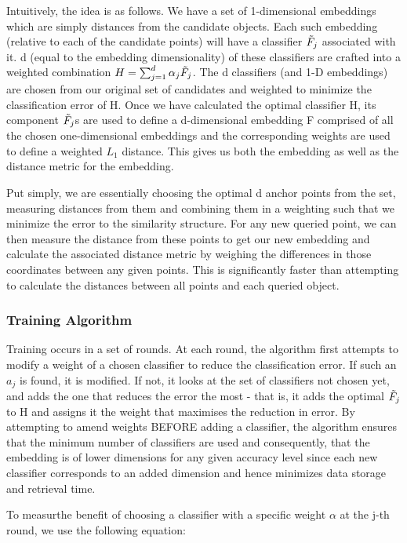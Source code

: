 Intuitively, the idea is as follows. We have a set of 1-dimensional embeddings which are simply distances from the candidate objects. Each such embedding (relative to each of the candidate points) will have a classifier $\Tilde{F}_j$ associated with it. d (equal to the embedding dimensionality) of these classifiers are crafted into a weighted combination $H = \sum_{j=1}^d \alpha_j \Tilde{F}_j$. The d classifiers (and 1-D embeddings) are chosen from our original set of candidates and weighted to minimize the classification error of H. 
Once we have calculated the optimal classifier H, its component $\Tilde{F}_j$s are used to define a d-dimensional embedding F comprised of all the chosen one-dimensional embeddings and the corresponding weights are used to define a weighted $L_1$ distance. This gives us both the embedding as well as the distance metric for the embedding.

Put simply, we are essentially choosing the optimal d anchor points from the set, measuring distances from them and combining them in a weighting such that we minimize the error to the similarity structure. For any new queried point, we can then measure the distance from these points to get our new embedding and calculate the associated distance metric by weighing the differences in those coordinates between any given points. This is significantly faster than attempting to calculate the distances between all points and each queried object.

\subsubsection{Training Algorithm}
Training occurs in a set of rounds. At each round, the algorithm first attempts to modify a weight of a chosen classifier to reduce the classification error. If such an $a_j$ is found, it is modified. If not, it looks at the set of classifiers not chosen yet, and adds the one that reduces the error the most - that is, it adds the optimal $\Tilde{F}_j$ to H and assigns it the weight that maximises the reduction in error.
By attempting to amend weights BEFORE adding a classifier, the algorithm ensures that the minimum number of classifiers are used and consequently, that the embedding is of lower dimensions for any given accuracy level since each new classifier corresponds to an added dimension and hence minimizes data storage and retrieval time.

To measurthe benefit of choosing a classifier with a specific weight $\alpha$ at the j-th round, we use the following equation:

